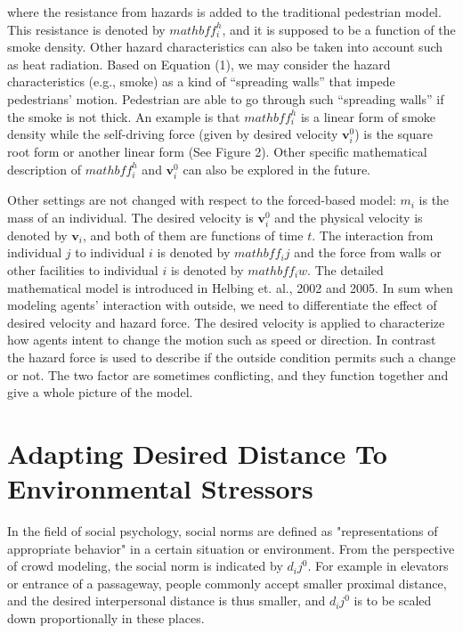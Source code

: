 \documentclass{article}
\begin{document}
	where the resistance from hazards is added to the traditional pedestrian model.  This resistance is denoted by $mathbf{f}_i^h$, and it is supposed to be a function of the smoke density.  Other hazard characteristics can also be taken into account such as heat radiation.  Based on Equation (1), we may consider the hazard characteristics (e.g., smoke) as a kind of “spreading walls” that impede pedestrians' motion.  Pedestrian are able to go through such “spreading walls” if the smoke is not thick.  An example is that $mathbf{f}_i^h$ is a linear form of smoke density while the self-driving force (given by desired velocity $\mathbf{v}_i^0$) is the square root form or another linear form (See Figure 2).  Other specific mathematical description of $mathbf{f}_i^h$ and $\mathbf{v}_i^0$ can also be explored in the future.  

    Other settings are not changed with respect to the forced-based model: $m_i$ is the mass of an individual.  The desired velocity is $\mathbf{v}_i^0$ and the physical velocity is denoted by $\mathbf{v}_i$, and both of them are functions of time $t$. The interaction from individual $j$ to individual $i$ is denoted by $mathbf{f}_ij$ and the force from walls or other facilities to individual $i$ is denoted by $mathbf{f}_iw$.  The detailed mathematical model is introduced in Helbing et. al., 2002 and 2005.  
    In sum when modeling agents' interaction with outside, we need to differentiate the effect of desired velocity and hazard force.  The desired velocity is applied to characterize how agents intent to change the motion such as speed or direction.  In contrast the hazard force is used to describe if the outside condition permits such a change or not.  The two factor are sometimes conflicting, and they function together and give a whole picture of the model. 	
	
\section{Adapting Desired Distance To Environmental Stressors}
In the field of social psychology, social norms are defined as "representations of appropriate behavior" in a certain situation or environment.  From the perspective of crowd modeling, the social norm is indicated by $d_ij^0$.  For example in elevators or entrance of a passageway, people commonly accept smaller proximal distance, and the desired interpersonal distance is thus smaller, and $d_ij^0$ is to be scaled down proportionally in these places.  
\end{document}

